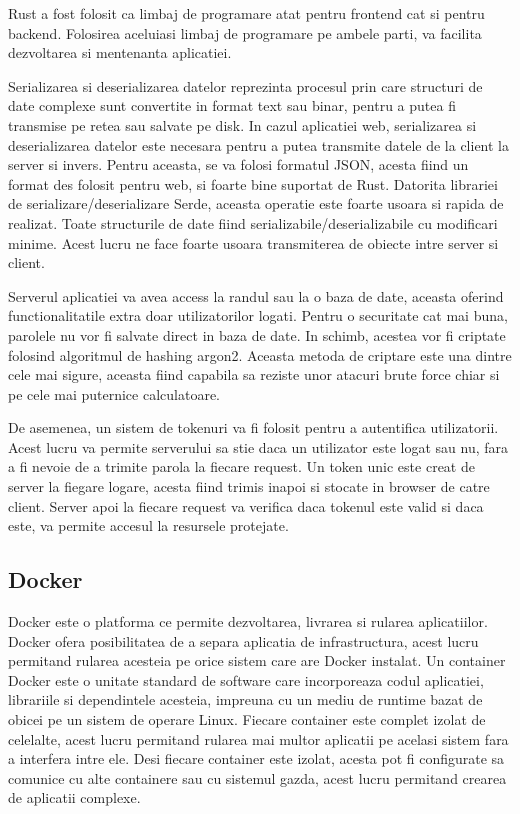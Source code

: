 \documentclass[titlepage,12pt]{article}
\begin{document}
\ac {Rust} a fost folosit ca limbaj de programare atat pentru frontend cat si pentru backend.
Folosirea aceluiasi limbaj de programare pe ambele parti, va facilita dezvoltarea si mentenanta aplicatiei.

Serializarea si deserializarea datelor reprezinta procesul prin care structuri de date complexe sunt convertite in format text sau binar, pentru a putea fi transmise pe retea sau salvate pe disk.
In cazul aplicatiei web, serializarea si deserializarea datelor este necesara pentru a putea transmite datele de la client la server si invers.
Pentru aceasta, se va folosi formatul JSON, acesta fiind un format des folosit pentru web, si foarte bine suportat de \ac {Rust}.
Datorita librariei de serializare/deserializare Serde, aceasta operatie este foarte usoara si rapida de realizat.
Toate structurile de date fiind serializabile/deserializabile cu modificari minime.
Acest lucru ne face foarte usoara transmiterea de obiecte intre server si client.

Serverul aplicatiei va avea access la randul sau la o baza de date, aceasta oferind functionalitatile extra doar utilizatorilor logati.
Pentru o securitate cat mai buna, parolele nu vor fi salvate direct in baza de date.
In schimb, acestea vor fi criptate folosind algoritmul de hashing argon2.
Aceasta metoda de criptare este una dintre cele mai sigure, aceasta fiind capabila sa reziste unor atacuri brute force chiar si pe cele mai puternice calculatoare.

De asemenea, un sistem de tokenuri va fi folosit pentru a autentifica utilizatorii.
Acest lucru va permite serverului sa stie daca un utilizator este logat sau nu, fara a fi nevoie de a trimite parola la fiecare request.
Un token unic este creat de server la fiegare logare, acesta fiind trimis inapoi si stocate in browser de catre client.
Server apoi la fiecare request va verifica daca tokenul este valid si daca este, va permite accesul la resursele protejate.

\subsection {Docker}

Docker\cite{ref:docker} este o platforma ce permite dezvoltarea, livrarea si rularea aplicatiilor.
Docker ofera posibilitatea de a separa aplicatia de infrastructura, acest lucru permitand rularea acesteia pe orice sistem care are Docker instalat.
Un container Docker este o unitate standard de software care incorporeaza codul aplicatiei, librariile si dependintele acesteia, impreuna cu un mediu de runtime bazat de obicei pe un sistem de operare Linux.
Fiecare container este complet izolat de celelalte, acest lucru permitand rularea mai multor aplicatii pe acelasi sistem fara a interfera intre ele.
Desi fiecare container este izolat, acesta pot fi configurate sa comunice cu alte containere sau cu sistemul gazda, acest lucru permitand crearea de aplicatii complexe.
\end{document}
